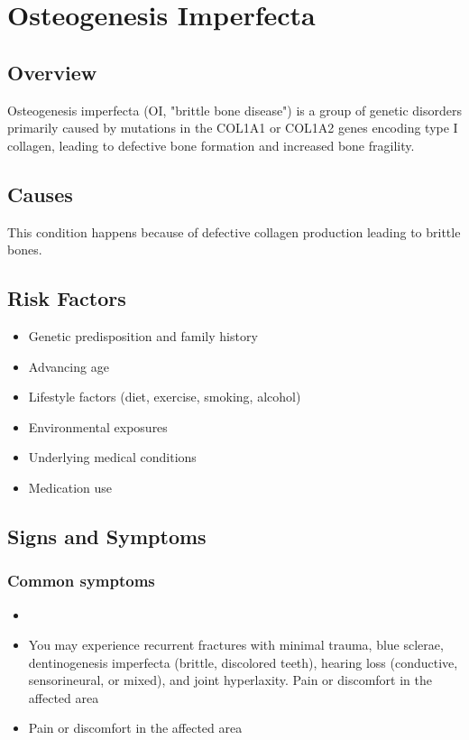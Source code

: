 \chapter{Osteogenesis Imperfecta}
\label{sec:Osteogenesis Imperfecta}

\section{Overview}
Osteogenesis imperfecta (OI, "brittle bone disease") is a group of genetic disorders primarily caused by mutations in the COL1A1 or COL1A2 genes encoding type I collagen, leading to defective bone formation and increased bone fragility.
\section{Causes}
This condition happens because of defective collagen production leading to brittle bones.     
\section{Risk Factors}

\begin{itemize}[noitemsep]
  \item Genetic predisposition and family history
  \item Advancing age
  \item Lifestyle factors (diet, exercise, smoking, alcohol)
  \item Environmental exposures
  \item Underlying medical conditions
  \item Medication use
\end{itemize}
\section{Signs and Symptoms}

\subsection{Common symptoms}
\begin{itemize}[noitemsep]
  \item \item You may experience recurrent fractures with minimal trauma, blue sclerae, dentinogenesis imperfecta (brittle, discolored teeth), hearing loss (conductive, sensorineural, or mixed), and joint hyperlaxity. Pain or discomfort in the affected area    \item Pain or discomfort in the affected area
  \end{itemize}

